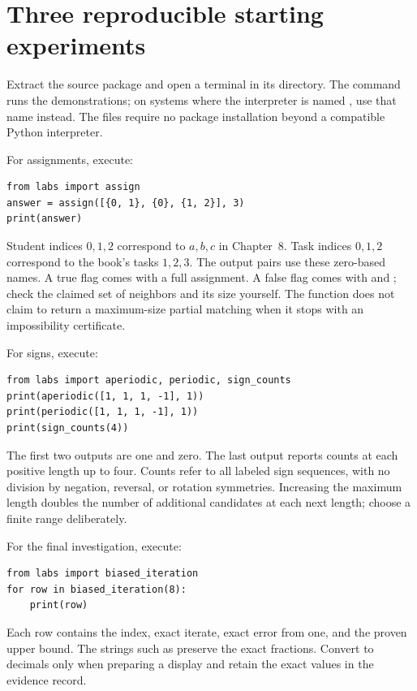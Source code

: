 \section{Three reproducible starting experiments}
Extract the source package and open a terminal in its directory. The command  runs the demonstrations; on systems where the interpreter is named , use that name instead. The files require no package installation beyond a compatible Python interpreter.

For assignments, execute:
\par\noindent\begin{minipage}{\linewidth}
\begin{lstlisting}
from labs import assign
answer = assign([{0, 1}, {0}, {1, 2}], 3)
print(answer)
\end{lstlisting}
\end{minipage}\par

Student indices $0,1,2$ correspond to $a,b,c$ in Chapter~8. Task indices $0,1,2$ correspond to the book's tasks $1,2,3$. The output pairs use these zero-based names. A true  flag comes with a full assignment. A false flag comes with  and ; check the claimed set of neighbors and its size yourself. The function does not claim to return a maximum-size partial matching when it stops with an impossibility certificate.

For signs, execute:
\par\noindent\begin{minipage}{\linewidth}
\begin{lstlisting}
from labs import aperiodic, periodic, sign_counts
print(aperiodic([1, 1, 1, -1], 1))
print(periodic([1, 1, 1, -1], 1))
print(sign_counts(4))
\end{lstlisting}
\end{minipage}\par

The first two outputs are one and zero. The last output reports counts at each positive length up to four. Counts refer to all labeled sign sequences, with no division by negation, reversal, or rotation symmetries. Increasing the maximum length doubles the number of additional candidates at each next length; choose a finite range deliberately.

For the final investigation, execute:
\par\noindent\begin{minipage}{\linewidth}
\begin{lstlisting}
from labs import biased_iteration
for row in biased_iteration(8):
    print(row)
\end{lstlisting}
\end{minipage}\par

Each row contains the index, exact iterate, exact error from one, and the proven upper bound. The strings such as  preserve the exact fractions. Convert to decimals only when preparing a display and retain the exact values in the evidence record.
